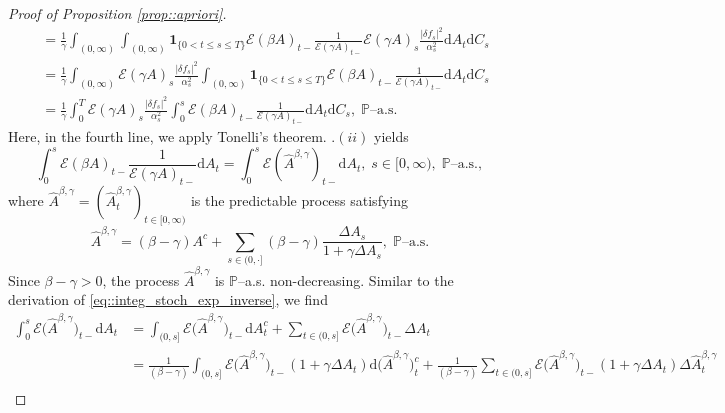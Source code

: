 \documentclass[10pt]{article} %
\newcommand\cE{\mathcal E}
\def \P{\mathbb{P}}
\newcommand{\1}{\mathbf{1}}
\def\d{\mathrm{d}}
\begin{document}
\begin{proof}[Proof of Proposition \ref{prop::apriori}]
\begin{align}
	&= \frac{1}{\gamma}\int_{(0,\infty)}\int_{(0,\infty)}\mathbf{1}_{\{0<t\leq s \leq T\}} \cE(\beta A)_{t-}  \frac{1}{\cE(\gamma A)_{t-}} \cE(\gamma A)_s \frac{|\delta f_s|^2}{\alpha^2_s} \d A_t \d C_s \nonumber\\
	&= \frac{1}{\gamma}\int_{(0,\infty)} \cE(\gamma A)_s \frac{|\delta f_s|^2}{\alpha^2_s} \int_{(0,\infty)}\mathbf{1}_{\{0<t\leq s \leq T\}} \cE(\beta A)_{t-}  \frac{1}{\cE(\gamma A)_{t-}} \d A_t \d C_s \nonumber\\
	&= \frac{1}{\gamma}\int_0^T \cE(\gamma A)_s \frac{|\delta f_s|^2}{\alpha^2_s} \int_0^s \cE(\beta A)_{t-}  \frac{1}{\cE(\gamma A)_{t-}} \d A_t \d C_s, \; \text{$\P$--a.s.}
\end{align}
Here, in the fourth line, we apply Tonelli's theorem. .$(ii)$ yields
\begin{equation*}
	\int_0^s \cE(\beta A)_{t-}  \frac{1}{\cE(\gamma A)_{t-}} \d A_t  = \int_0^s \cE(\widehat A^{\beta,\gamma})_{t-} \d A_t,\; s \in [0,\infty), \; \text{$\P$--a.s.},
\end{equation*}
where $\widehat A^{\beta,\gamma} = (\widehat A^{\beta,\gamma}_t)_{t \in [0,\infty)}$ is the predictable process satisfying
\begin{equation}\label{eq::widehat_A_beta_gamma}
	\widehat A^{\beta,\gamma} = (\beta-\gamma)A^c + \sum_{s \in (0,\cdot]} (\beta-\gamma)\frac{\Delta A_s}{1+\gamma\Delta A_s}, \; \text{$\P$--a.s.}
\end{equation}
Since $\beta-\gamma > 0$, the process $\widehat A^{\beta,\gamma}$ is $\P$--a.s. non-decreasing. Similar to the derivation of \eqref{eq::integ_stoch_exp_inverse}, we find
\begin{align}\label{eq::widehat_A_integral}
	\int_0^s \cE\big(\widehat A^{\beta,\gamma}\big)_{t-} \d A_t &= \int_{(0,s]} \cE\big(\widehat A^{\beta,\gamma}\big)_{t-} \d A^c_t + \sum_{t \in (0,s]} \cE\big(\widehat A^{\beta,\gamma}\big)_{t-} \Delta A_t \nonumber\\
	&= \frac{1}{(\beta-\gamma)}\int_{(0,s]} \cE\big(\widehat A^{\beta,\gamma}\big)_{t-} (1+\gamma\Delta A_t) \d \big(\widehat A^{\beta,\gamma}\big)^c_t + \frac{1}{(\beta-\gamma)}\sum_{t \in (0,s]} \cE\big(\widehat A^{\beta,\gamma}\big)_{t-} (1+\gamma\Delta A_t) \Delta \widehat A^{\beta,\gamma}_t \nonumber\\

\end{align}
\end{proof}
\end{document}
